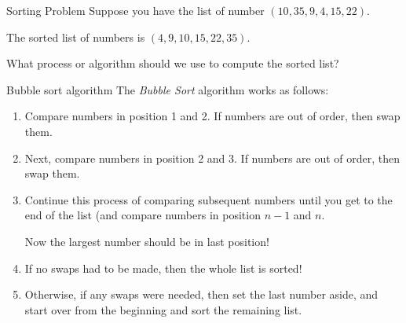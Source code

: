 \begin{example}{Sorting Problem}{}
Suppose you have the list of number $(10, 35, 9, 4, 15, 22)$.

The sorted list of numbers is $(4,9,10,15,22,35)$.
\end{example}

What process or algorithm should we use to compute the sorted list?

\begin{general}{Bubble sort algorithm}{}
The \emph{Bubble Sort} algorithm works as follows:
\begin{enumerate}
\item Compare numbers in position 1 and 2.  If numbers are out of order, then swap them.
\item Next, compare numbers in position 2 and 3.  If numbers are out of order, then swap them.
\item Continue this process of comparing subsequent numbers until you get to the end of the list (and compare numbers in position $n-1$ and $n$.

Now the largest number should be in last position!
\item If no swaps had to be made, then the whole list is sorted!
\item Otherwise, if any swaps were needed, then set the last number aside, and start over from the beginning and sort the remaining list.
\end{enumerate}
\end{general}

